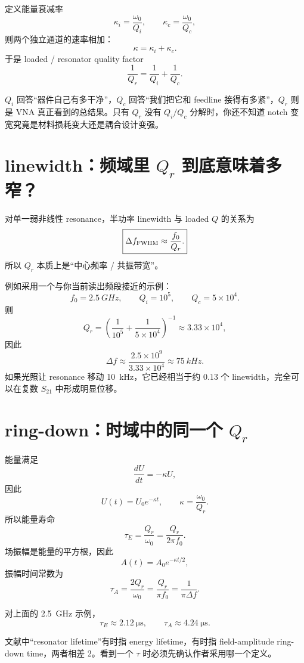 \documentclass[11pt,a4paper,openany]{ctexrep}
\begin{document}
定义能量衰减率
\[
\kappa_i=\frac{\omega_0}{Q_i},
\qquad
\kappa_c=\frac{\omega_0}{Q_c},
\]
则两个独立通道的速率相加：
\[
\kappa=\kappa_i+\kappa_c.
\]
于是 loaded / resonator quality factor
\[
\boxed{
\frac{1}{Q_r}=\frac{1}{Q_i}+\frac{1}{Q_c}.
}
\]

\begin{intuitionbox}
$Q_i$ 回答“器件自己有多干净”，$Q_c$ 回答“我们把它和 feedline 接得有多紧”，$Q_r$ 则是 VNA 真正看到的总结果。只有 $Q_r$ 没有 $Q_i/Q_c$ 分解时，你还不知道 notch 变宽究竟是材料损耗变大还是耦合设计变强。
\end{intuitionbox}

\section{linewidth：频域里 $Q_r$ 到底意味着多窄？}

对单一弱非线性 resonance，半功率 linewidth 与 loaded $Q$ 的关系为
\[
\boxed{
\Delta f_{\rm FWHM}\approx\frac{f_0}{Q_r}.
}
\]
所以 $Q_r$ 本质上是“中心频率 / 共振带宽”。

例如采用一个与你当前读出频段接近的示例：
\[
f_0=\SI{2.5}{GHz},\qquad Q_i=10^5,\qquad Q_c=5\times10^4.
\]
则
\[
Q_r=\left(\frac1{10^5}+\frac1{5\times10^4}\right)^{-1}
\approx3.33\times10^4,
\]
因此
\[
\boxed{
\Delta f\approx\frac{2.5\times10^9}{3.33\times10^4}
\approx\SI{75}{kHz}.
}
\]
如果光照让 resonance 移动 \SI{10}{kHz}，它已经相当于约 $0.13$ 个 linewidth，完全可以在复数 $S_{21}$ 中形成明显位移。

\section{ring-down：时域中的同一个 $Q_r$}

能量满足
\[
\frac{dU}{dt}=-\kappa U,
\]
因此
\[
U(t)=U_0e^{-\kappa t},
\qquad
\kappa=\frac{\omega_0}{Q_r}.
\]
所以能量寿命
\[
\boxed{
\tau_E=\frac{Q_r}{\omega_0}=\frac{Q_r}{2\pi f_0}.
}
\]
场振幅是能量的平方根，因此
\[
A(t)=A_0e^{-\kappa t/2},
\]
振幅时间常数为
\[
\boxed{
\tau_A=\frac{2Q_r}{\omega_0}=\frac{Q_r}{\pi f_0}
=\frac{1}{\pi\Delta f}.
}
\]

对上面的 \SI{2.5}{GHz} 示例，
\[
\tau_E\approx\SI{2.12}{\micro\second},
\qquad
\tau_A\approx\SI{4.24}{\micro\second}.
\]

\begin{mistakebox}
文献中“resonator lifetime”有时指 energy lifetime，有时指 field-amplitude ring-down time，两者相差 2。看到一个 $\tau$ 时必须先确认作者采用哪一个定义。
\end{mistakebox}
\end{document}
